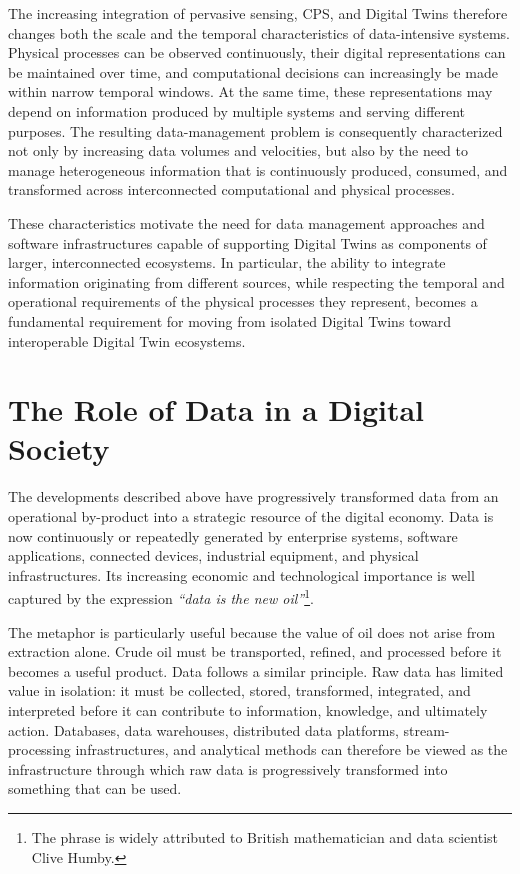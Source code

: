 The increasing integration of pervasive sensing, CPS, and Digital Twins therefore changes both the scale and the temporal characteristics of data-intensive systems. Physical processes can be observed continuously, their digital representations can be maintained over time, and computational decisions can increasingly be made within narrow temporal windows. At the same time, these representations may depend on information produced by multiple systems and serving different purposes. The resulting data-management problem is consequently characterized not only by increasing data volumes and velocities, but also by the need to manage heterogeneous information that is continuously produced, consumed, and transformed across interconnected computational and physical processes.

These characteristics motivate the need for data management approaches and software infrastructures capable of supporting Digital Twins as components of larger, interconnected ecosystems. In particular, the ability to integrate information originating from different sources, while respecting the temporal and operational requirements of the physical processes they represent, becomes a fundamental requirement for moving from isolated Digital Twins toward interoperable Digital Twin ecosystems.



\section{The Role of Data in a Digital Society}

\label{sec:role_of_data}


The developments described above have progressively transformed data from an operational by-product into a strategic resource of the digital economy. Data is now continuously or repeatedly generated by enterprise systems, software applications, connected devices, industrial equipment, and physical infrastructures. Its increasing economic and technological importance is well captured by the expression \emph{``data is the new oil''}\footnote{The phrase is widely attributed to British mathematician and data scientist Clive Humby\cite{humby2006data}.}.

The metaphor is particularly useful because the value of oil does not arise from extraction alone. Crude oil must be transported, refined, and processed before it becomes a useful product. Data follows a similar principle. Raw data has limited value in isolation: it must be collected, stored, transformed, integrated, and interpreted before it can contribute to information, knowledge, and ultimately action. Databases, data warehouses, distributed data platforms, stream-processing infrastructures, and analytical methods can therefore be viewed as the infrastructure through which raw data is progressively transformed into something that can be used.

